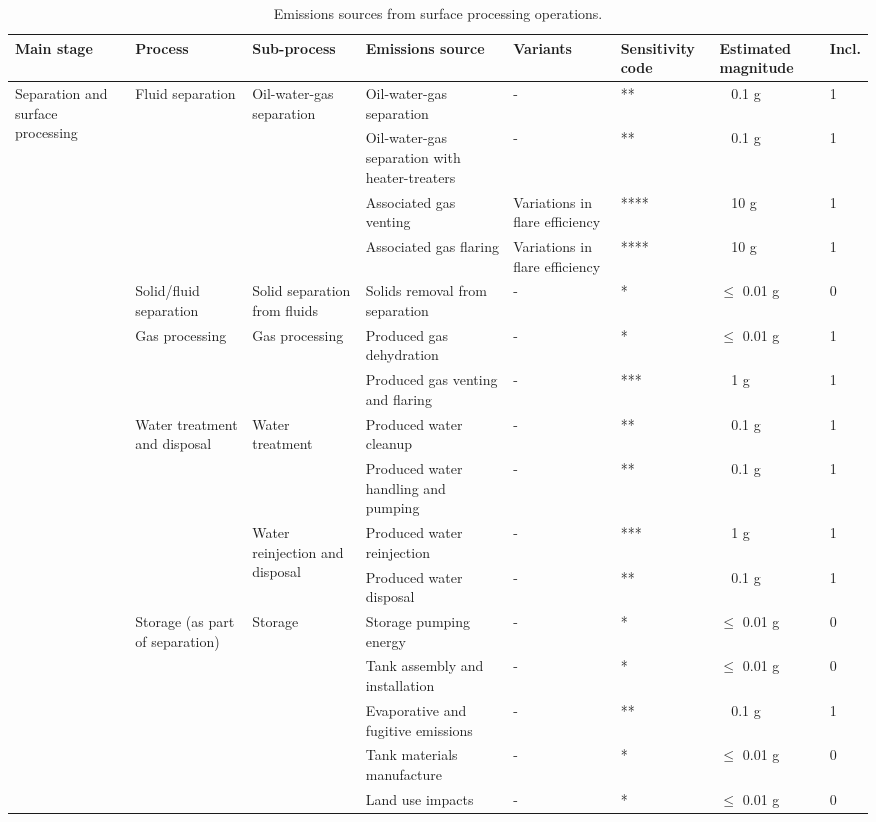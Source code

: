 \documentclass[11pt]{report}
\begin{document}
\begin{landscape}
\begin{table}
\begin{scriptsize}
\caption{Emissions sources from surface processing operations.}
\label{tab:processing_sources}
\begin{tabular}{|p{}|p{}|p{}|p{}|p{}|p{}|p{}|p{}|}
\hline
\textbf{Main stage} & \textbf{Process} & \textbf{Sub-process} & \textbf{Emissions source} & \textbf{Variants}& \textbf{Sensitivity code} & \textbf{Estimated magnitude} & \textbf{Incl.}\\
\hline
\multirow{16}{0.08\columnwidth}{Separation and surface processing} & \multirow{4}{0.09\columnwidth}{Fluid separation} & \multirow{4}{0.12\columnwidth}{Oil-water-gas separation} & Oil-water-gas separation & - & ** & ~ 0.1 g & 1\\
\cline{4-8}
& & & Oil-water-gas separation with heater-treaters & - & ** & ~ 0.1 g & 1\\
\cline{4-8}
& & & Associated gas venting & Variations in flare efficiency & **** & ~ 10 g & 1\\
\cline{4-8}
& & & Associated gas flaring & Variations in flare efficiency & **** & ~ 10 g & 1\\
\cline{2-8}
& Solid/fluid separation & Solid separation from fluids & Solids removal from separation & - & * & $\leq$ 0.01 g & 0\\
\cline{2-8}
& \multirow{2}{0.09\columnwidth}{Gas processing} & \multirow{2}{0.12\columnwidth}{Gas processing} & Produced gas dehydration & - & * & $\leq$ 0.01 g & 1\\
\cline{4-8}
& & & Produced gas venting and flaring & - & *** & ~ 1 g & 1\\
\cline{2-8}
& \multirow{4}{0.09\columnwidth}{Water treatment and disposal} & \multirow{2}{0.12\columnwidth}{Water treatment} & Produced water cleanup & - & ** & ~ 0.1 g & 1\\
\cline{4-8}
& & & Produced water handling and pumping & - & ** & ~ 0.1 g & 1\\
\cline{3-8}
& & \multirow{2}{0.09\columnwidth}{Water reinjection and disposal} & Produced water reinjection & - & *** & ~ 1 g & 1\\
\cline{4-8}
& & & Produced water disposal & - & ** & ~ 0.1 g & 1\\
\cline{2-8}
& \multirow{5}{0.09\columnwidth}{Storage (as part of separation)} & \multirow{5}{0.12\columnwidth}{Storage} & Storage pumping energy & - & * & $\leq$ 0.01 g & 0\\
\cline{4-8}
& & & Tank assembly and installation & - & * & $\leq$ 0.01 g & 0\\
\cline{4-8}
& & & Evaporative and fugitive emissions & - & ** & ~ 0.1 g & 1\\
\cline{4-8}
& & & Tank materials manufacture & - & * & $\leq$ 0.01 g & 0\\
\cline{4-8}
& & & Land use impacts & - & * & $\leq$ 0.01 g & 0\\
\hline
\end{tabular}
\end{scriptsize}
\end{table}



\end{landscape}
\end{document}
